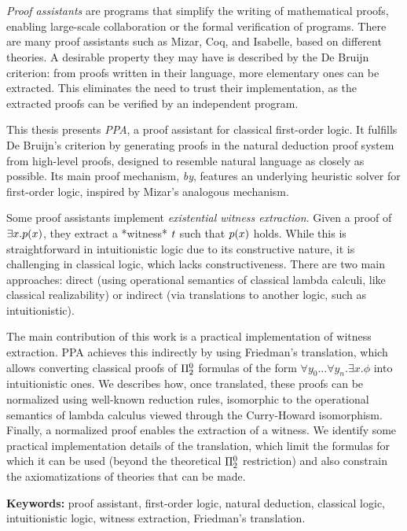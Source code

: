 \chapter*{\runtitle}

\noindent \textit{Proof assistants} are programs that simplify the writing of
mathematical proofs, enabling large-scale collaboration or the formal
verification of programs. There are many proof assistants such as Mizar, Coq,
and Isabelle, based on different theories. A desirable property they may have is
described by the De Bruijn criterion: from proofs written in their language,
more elementary ones can be extracted. This eliminates the need to trust their
implementation, as the extracted proofs can be verified by an independent
program.

This thesis presents \textit{PPA}, a proof assistant for classical first-order logic. It fulfills De Bruijn's criterion by generating proofs in the natural deduction proof system from high-level proofs, designed to resemble natural language as closely as possible. Its main proof mechanism, \textit{by}, features an underlying heuristic solver for first-order logic, inspired by Mizar's analogous mechanism.

Some proof assistants implement \textit{existential witness extraction}. Given a proof of $\exists x . p(x)$, they extract a *witness* \( t \) such that \( p(x) \) holds. While this is straightforward in intuitionistic logic due to its constructive nature, it is challenging in classical logic, which lacks constructiveness. There are two main approaches: direct (using operational semantics of classical lambda calculi, like classical realizability) or indirect (via translations to another logic, such as intuitionistic).

The main contribution of this work is a practical implementation of witness extraction. PPA achieves this indirectly by using Friedman's translation, which allows converting classical proofs of \( \Pi^0_{2} \) formulas of the form \( \forall y_0 \dots \forall y_n . \exists x . \phi \) into intuitionistic ones. We describes how, once translated, these proofs can be normalized using well-known reduction rules, isomorphic to the operational semantics of lambda calculus viewed through the Curry-Howard isomorphism. Finally, a normalized proof enables the extraction of a witness. We identify some practical implementation details of the translation, which limit the formulas for which it can be used (beyond the theoretical \( \Pi^0_{2} \) restriction) and also constrain the axiomatizations of theories that can be made.

\bigskip

\noindent\textbf{Keywords:} proof assistant, first-order logic, natural deduction, classical logic, intuitionistic logic, witness extraction, Friedman's translation.